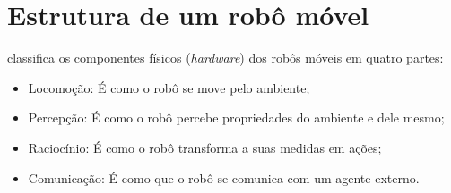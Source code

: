 \vspace{2cm} %
\section{Estrutura de um robô móvel} \label{cap:sensores}




 classifica os componentes físicos (\textit{hardware}) dos robôs móveis em quatro partes:

\begin{itemize}
 \item Locomoção: É como o robô se move pelo ambiente; 
 
 \item Percepção: É como o robô percebe propriedades do ambiente e dele mesmo;
 
 \item Raciocínio: É como o robô transforma a suas medidas em ações;
 
 \item Comunicação: É como que o robô se comunica com um agente externo.
 
\end{itemize}

